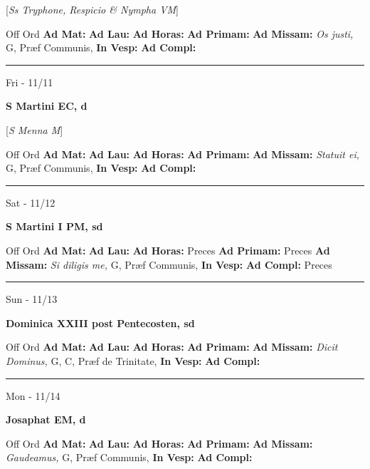 \documentclass[letterpaper, 10pt]{article}
\begin{document}
[\textit{Ss Tryphone, Respicio \& Nympha VM}]
\begin{justify}
Off Ord
\textbf{Ad Mat: }
\textbf{Ad Lau: }
\textbf{Ad Horas: }
\textbf{Ad Primam: }
\textbf{Ad Missam:} \textit{Os justi, } G, Præf Communis, 
\textbf{In Vesp: }
\textbf{Ad Compl: }\end{justify}



\hrule
\begin{center}
Fri - 11/11
\end{center}\textbf{ \large S Martini  EC, \textnormal{\normalsize d}}

[\textit{S Menna M}]
\begin{justify}
Off Ord
\textbf{Ad Mat: }
\textbf{Ad Lau: }
\textbf{Ad Horas: }
\textbf{Ad Primam: }
\textbf{Ad Missam:} \textit{Statuit ei, } G, Præf Communis, 
\textbf{In Vesp: }
\textbf{Ad Compl: }\end{justify}



\hrule
\begin{center}
Sat - 11/12
\end{center}\textbf{ \large S Martini I PM, \textnormal{\normalsize sd}}
\begin{justify}
Off Ord
\textbf{Ad Mat: }
\textbf{Ad Lau: }
\textbf{Ad Horas: }Preces
\textbf{Ad Primam: }Preces
\textbf{Ad Missam:} \textit{Si diligis me, } G, Præf Communis, 
\textbf{In Vesp: }
\textbf{Ad Compl: }Preces\end{justify}



\hrule
\begin{center}
Sun - 11/13
\end{center}\textbf{ \large Dominica XXIII post Pentecosten, \textnormal{\normalsize sd}}
\begin{justify}
Off Ord
\textbf{Ad Mat: }
\textbf{Ad Lau: }
\textbf{Ad Horas: }
\textbf{Ad Primam: }
\textbf{Ad Missam:} \textit{Dicit Dominus, } G, C, Præf de Trinitate, 
\textbf{In Vesp: }
\textbf{Ad Compl: }\end{justify}



\hrule
\begin{center}
Mon - 11/14
\end{center}\textbf{ \large Josaphat EM, \textnormal{\normalsize d}}
\begin{justify}
Off Ord
\textbf{Ad Mat: }
\textbf{Ad Lau: }
\textbf{Ad Horas: }
\textbf{Ad Primam: }
\textbf{Ad Missam:} \textit{Gaudeamus, } G, Præf Communis, 
\textbf{In Vesp: }
\textbf{Ad Compl: }\end{justify}
\end{document}

